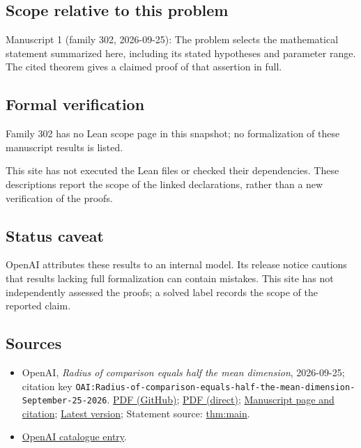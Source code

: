 \documentclass[11pt]{article}
\begin{document}
\subsection{Scope relative to this problem}
Manuscript 1 (family 302, 2026-09-25): The problem selects the mathematical statement summarized here, including its stated hypotheses and parameter range. The cited theorem gives a claimed proof of that assertion in full.

\subsection{Formal verification}
Family 302 has no Lean scope page in this snapshot; no formalization of these manuscript results is listed.

This site has not executed the Lean files or checked their dependencies. These descriptions report the scope of the linked declarations, rather than a new verification of the proofs.

\subsection{Status caveat}
OpenAI attributes these results to an internal model. Its release notice cautions that results lacking full formalization can contain mistakes. This site has not independently assessed the proofs; a solved label records the scope of the reported claim.

\subsection{Sources}
\begin{itemize}
\item OpenAI, \emph{Radius of comparison equals half the mean dimension}, 2026-09-25; citation key \texttt{OAI:Radius-of-comparison-equals-half-the-mean-dimension-September-25-2026}. \href{https://github.com/openai/math/blob/adc7f1241b42e322a6451854ab7e4b4c146bf78a/preprints/Radius-of-comparison-equals-half-the-mean-dimension-September-25-2026/paper.pdf}{PDF (GitHub)}; \href{https://github.com/openai/math/raw/adc7f1241b42e322a6451854ab7e4b4c146bf78a/preprints/Radius-of-comparison-equals-half-the-mean-dimension-September-25-2026/paper.pdf}{PDF (direct)}; \href{https://github.com/openai/math/blob/adc7f1241b42e322a6451854ab7e4b4c146bf78a/preprints/Radius-of-comparison-equals-half-the-mean-dimension-September-25-2026/README.md}{Manuscript page and citation}; \href{https://github.com/openai/math/blob/main/preprints/Radius-of-comparison-equals-half-the-mean-dimension-September-25-2026/paper.pdf}{Latest version}; Statement source: \href{https://github.com/openai/math/blob/adc7f1241b42e322a6451854ab7e4b4c146bf78a/preprints/Radius-of-comparison-equals-half-the-mean-dimension-September-25-2026/build/sections/01-introduction.tex\#L51}{thm:main}.
\item \href{https://github.com/openai/math/blob/adc7f1241b42e322a6451854ab7e4b4c146bf78a/CONTENTS.md}{OpenAI catalogue entry}.
\end{itemize}
\end{document}
